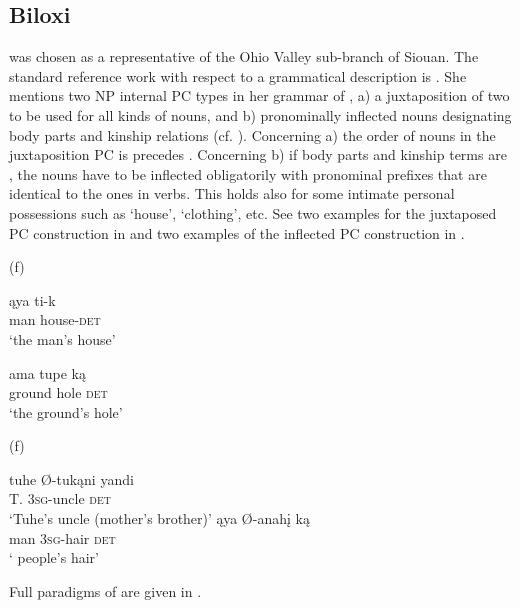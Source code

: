 \documentclass[output=paper]{LSP/langsci}
\begin{document}
\subsection{Biloxi}\label{sec:helmbrecht:4.6}\label{biloxi}
 was chosen as a representative of the Ohio Valley sub-branch of Siouan. The standard reference work with respect to a grammatical description is \citet{Einaudi1976}. She mentions two NP internal PC types in her grammar of , a) a juxtaposition of two  to be used for all kinds of  nouns, and b) pronominally inflected nouns designating body parts and kinship relations (cf. \citealt[57--68]{Einaudi1976}). Concerning a) the order of nouns in the juxtaposition PC is  precedes . Concerning b) if body parts and kinship terms are , the  nouns have to be inflected obligatorily with pronominal prefixes that are identical to the ones in verbs. This holds also for some intimate personal possessions such as `house', `clothing', etc. See two examples for the juxtaposed PC construction in  and two examples of the inflected PC construction in .

\ea {} (\citealt[139]{Einaudi1976}f) \label{biloxihouse}

\ea
\gll \k{a}ya   ti-k		\\				
man house-\textsc{det} \\
\glt `the man's house'

\ex 
\gll ama tupe k\k{a} \\
ground hole \textsc{det} \\
\glt `the ground's hole'
\z \z

\ea	{} (\citealt[139]{Einaudi1976}f) \label{biloxiuncle}

\ea \gll tuhe   Ø-tukąni       yandi	\\  
T.      \textsc{3sg}-uncle    \textsc{det} \\
\glt `Tuhe's uncle (mother's brother)'
\ex \gll ąya   Ø-anahį    k\k{a} \\
man \textsc{3sg}-hair   \textsc{det} \\
\glt `	people's hair'
\z \z

Full paradigms of  are given in .
\end{document}
